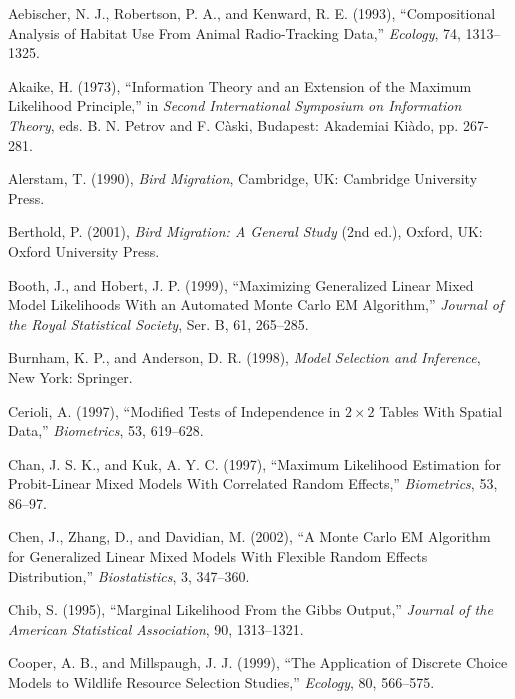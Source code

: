 \documentclass[11pt]{asaproc}
\begin{document}

\begin{references}
\itemsep=0pt
{\footnotesize
\item 
Aebischer, N. J., Robertson, P. A., and Kenward, R. E. (1993), ``Compositional Analysis of Habitat Use From Animal Radio-Tracking Data,'' {\it Ecology}, 74, 1313--1325.

\item 
Akaike, H. (1973), ``Information Theory and an Extension of the Maximum Likelihood Principle,'' in {\it Second International Symposium on Information Theory}, eds. B. N. Petrov and F. C{\` a}ski, Budapest: Akademiai Ki{\` a}do, pp. 267-281.

\item 
Alerstam, T. (1990), {\it Bird Migration}, Cambridge, UK: Cambridge University Press.

\item 
Berthold, P. (2001), {\it Bird Migration: A General Study} (2nd ed.), Oxford, UK: Oxford University Press.

\item 
Booth, J., and Hobert, J. P. (1999), ``Maximizing Generalized Linear Mixed Model Likelihoods With an Automated Monte Carlo EM Algorithm,'' {\it Journal of the Royal Statistical Society}, Ser. B, 61, 265--285.

\item 
Burnham, K. P., and Anderson, D. R. (1998), {\it Model Selection and Inference}, New York: Springer.

\item 
Cerioli, A. (1997), ``Modified Tests of Independence in $2 \times 2$ Tables With Spatial Data,'' {\it Biometrics}, 53, 619--628.

\item
Chan, J. S. K., and Kuk, A. Y. C. (1997), ``Maximum Likelihood Estimation for Probit-Linear Mixed Models With Correlated Random Effects,'' {\it Biometrics}, 53, 86--97. 

\item
Chen, J., Zhang, D., and Davidian, M. (2002), ``A Monte Carlo EM Algorithm for Generalized Linear Mixed Models With Flexible Random Effects Distribution,'' {\it Biostatistics}, 3, 347--360.

\item
Chib, S. (1995), ``Marginal Likelihood From the Gibbs Output,'' {\it Journal of the American Statistical Association}, 90, 1313--1321.

\item
Cooper, A. B., and Millspaugh, J. J. (1999), ``The Application of Discrete Choice Models to Wildlife Resource Selection Studies,'' {\it Ecology}, 80, 
566--575.

}
\end{references}
\end{document}
